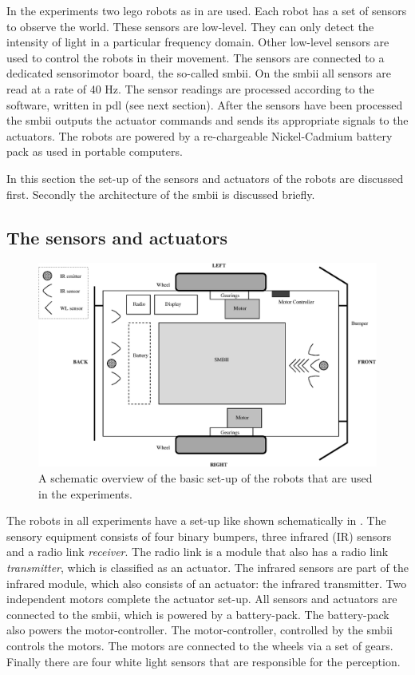 In the experiments two {\sc lego} robots as in  are used. Each robot has a set of sensors to observe the world. These sensors are low-level. They can only detect the intensity of light in a particular frequency domain. Other low-level sensors are used to control the robots in their movement. The sensors are connected to a dedicated sensorimotor board, the so-called {\sc smbii}. On the {\sc smbii} all sensors are read at a rate of 40 Hz. The sensor readings are processed according to the software, written in {\sc pdl} (see next section). After the sensors have been processed the {\sc smbii} outputs the actuator commands and sends its appropriate signals to the actuators. The robots are powered by a re-chargeable Nickel-Cadmium battery pack as used in portable computers.

In this section the set-up of the sensors and actuators of the robots are discussed first. Secondly the architecture of the {\sc smbii} is discussed briefly.

\subsection{The sensors and actuators}\label{s:robots:sensors}

\begin{figure}[t]
\centerline{\includegraphics[width=12cm]{robots//schema_robots_exp2.eps}}
\caption{A schematic overview of the basic set-up of the robots that are used in the experiments.}
\label{f:robots:robots_general}
\end{figure}

The robots in all experiments have a set-up like shown schematically in . The sensory equipment consists of four binary bumpers, three infrared (IR) sensors and a radio link {\em receiver}. The radio link is a module that also has a radio link {\em transmitter}, which is classified as an actuator. The infrared sensors are part of the infrared module, which also consists of an actuator: the infrared transmitter. Two independent motors complete the actuator set-up. All sensors and actuators are connected to the {\sc smbii}, which is powered by a battery-pack. The battery-pack also powers the motor-controller. The motor-controller, controlled by the {\sc smbii} controls the motors. The motors are connected to the wheels via a set of gears. Finally there are four white light sensors that are responsible for the perception.

